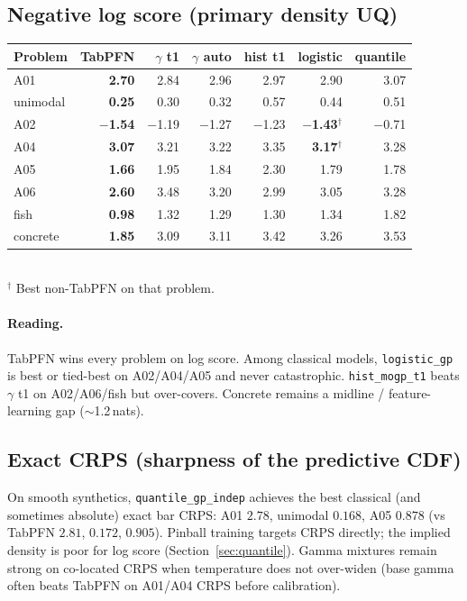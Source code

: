 \documentclass[11pt,a4paper]{article}
\theoremstyle{definition}
\begin{document}
\subsection{Negative log score (primary density UQ)}
\begin{center}
\renewcommand{\arraystretch}{1.05}
\scriptsize
\begin{tabular}{@{}lrrrrrr@{}}
\toprule
Problem & TabPFN & $\gamma$ t1 & $\gamma$ auto & hist t1 & \textbf{logistic} & quantile \\
\midrule
A01 & \textbf{2.70} & 2.84 & 2.96 & 2.97 & 2.90 & 3.07 \\
unimodal & \textbf{0.25} & 0.30 & 0.32 & 0.57 & 0.44 & 0.51 \\
A02 & \textbf{$-$1.54} & $-$1.19 & $-$1.27 & $-$1.23 & \textbf{$-$1.43}$^\dagger$ & $-$0.71 \\
A04 & \textbf{3.07} & 3.21 & 3.22 & 3.35 & \textbf{3.17}$^\dagger$ & 3.28 \\
A05 & \textbf{1.66} & 1.95 & 1.84 & 2.30 & 1.79 & 1.78 \\
A06 & \textbf{2.60} & 3.48 & 3.20 & 2.99 & 3.05 & 3.28 \\
fish & \textbf{0.98} & 1.32 & 1.29 & 1.30 & 1.34 & 1.82 \\
concrete & \textbf{1.85} & 3.09 & 3.11 & 3.42 & 3.26 & 3.53 \\
\bottomrule
\end{tabular}\\[0.3em]
{\footnotesize $^\dagger$ Best non-TabPFN on that problem.}
\end{center}

\paragraph{Reading.}
TabPFN wins every problem on log score. Among classical models,
\texttt{logistic\_gp} is best or tied-best on A02/A04/A05 and never catastrophic.
\texttt{hist\_mogp\_t1} beats $\gamma$ t1 on A02/A06/fish but over-covers.
Concrete remains a midline / feature-learning gap ($\sim$1.2\,nats).

\subsection{Exact CRPS (sharpness of the predictive CDF)}
On smooth synthetics, \texttt{quantile\_gp\_indep} achieves the best classical
(and sometimes absolute) exact bar CRPS: A01 $2.78$, unimodal $0.168$, A05
$0.878$ (vs TabPFN $2.81$, $0.172$, $0.905$). Pinball training targets CRPS
directly; the implied density is poor for log score (Section~\ref{sec:quantile}).
Gamma mixtures remain strong on co-located CRPS when temperature does not
over-widen (base gamma often beats TabPFN on A01/A04 CRPS before calibration).
\end{document}
